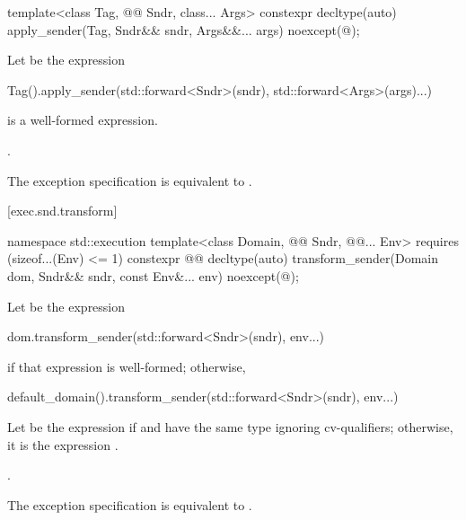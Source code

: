 %
\begin{itemdecl}
template<class Tag, @@ Sndr, class... Args>
constexpr decltype(auto) apply_sender(Tag, Sndr&& sndr, Args&&... args)
  noexcept(@\seebelow@);
\end{itemdecl}

\begin{itemdescr}
\pnum
Let  be the expression
\begin{codeblock}
  Tag().apply_sender(std::forward<Sndr>(sndr), std::forward<Args>(args)...)
\end{codeblock}

\pnum
\constraints
{} is a well-formed expression.

\pnum
\returns
{}.

\pnum
\remarks
The exception specification is equivalent to .
\end{itemdescr}

[exec.snd.transform]{}

%
\begin{itemdecl}
namespace std::execution {
  template<class Domain, @@ Sndr, @@... Env>
      requires (sizeof...(Env) <= 1)
    constexpr @@ decltype(auto) transform_sender(Domain dom, Sndr&& sndr, const Env&... env)
      noexcept(@\seebelow@);
}
\end{itemdecl}

\begin{itemdescr}
\pnum
Let  be the expression
\begin{codeblock}
dom.transform_sender(std::forward<Sndr>(sndr), env...)
\end{codeblock}
if that expression is well-formed; otherwise,
\begin{codeblock}
default_domain().transform_sender(std::forward<Sndr>(sndr), env...)
\end{codeblock}
Let  be the expression 
if  and 
have the same type ignoring cv-qualifiers;
otherwise, it is
the expression .

\pnum
\returns
{}.

\pnum
\remarks
The exception specification is equivalent to
.
\end{itemdescr}

